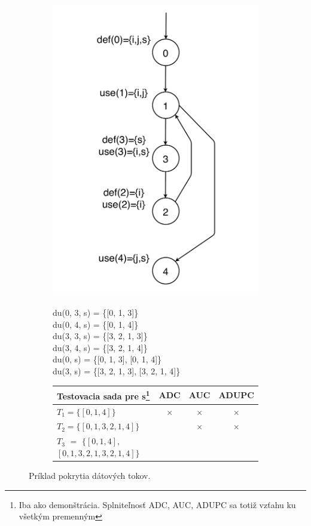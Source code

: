 \begin{figure}[H]
	\begin{subfigure}{0.5\linewidth}
		\centering
		\includegraphics[width=0.8\linewidth]{obrazky/cfg_def_use.pdf}
	\end{subfigure}
	\quad
	\begin{subfigure}{0.5\linewidth}
		du(0, 3, s) = \{[0, 1, 3]\} \\
		du(0, 4, s) = \{[0, 1, 4]\} \\
		du(3, 3, s) = \{[3, 2, 1, 3]\} \\
		du(3, 4, s) = \{[3, 2, 1, 4]\} \\

		du(0, s) = \{[0, 1, 3], [0, 1, 4]\} \\
		du(3, s) = \{[3, 2, 1, 3], [3, 2, 1, 4]\}
	\end{subfigure}
	\bigskip
	\begin{subfigure}{\linewidth}
		\centering
		\begin{tabular}{ |l|c|c|c|  } 
			\hline
			Testovacia sada pre s\footnote{Iba ako demonštrácia. Splniteľnosť ADC, AUC, ADUPC sa totiž vzťahu ku všetkým premenným}& ADC & AUC & ADUPC \\ 
			\hline
			\hline
			$T_1 = \{[0, 1, 4]\}$ & $\times$ & $\times$ & $\times$ \\ 
			\hline
			$T_2 = \{[0, 1, 3, 2, 1, 4]\}$ & \checkmark & $\times$ & $\times$ \\ 
			\hline
			$T_3$ $=$ $\{[0, 1, 4],$ $[0, 1, 3, 2, 1, 3, 2, 1, 4]\}$ & \checkmark & \checkmark & \checkmark \\ 
			\hline
		\end{tabular}
	\end{subfigure}
	\caption{Príklad pokrytia dátových tokov.}
\end{figure}

